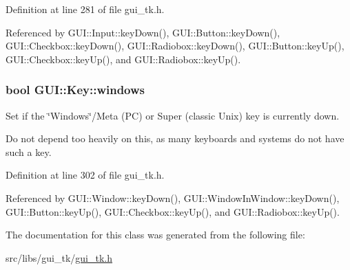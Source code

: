 Definition at line 281 of file gui\-\_\-tk.\-h.



Referenced by G\-U\-I\-::\-Input\-::key\-Down(), G\-U\-I\-::\-Button\-::key\-Down(), G\-U\-I\-::\-Checkbox\-::key\-Down(), G\-U\-I\-::\-Radiobox\-::key\-Down(), G\-U\-I\-::\-Button\-::key\-Up(), G\-U\-I\-::\-Checkbox\-::key\-Up(), and G\-U\-I\-::\-Radiobox\-::key\-Up().

\hypertarget{classGUI_1_1Key_abc017c8f165f2b4c857c757ef413da3c}{
\subsubsection[{windows}]{\setlength{\rightskip}{0pt plus 5cm}bool {\bf G\-U\-I\-::\-Key\-::windows}}}\label{classGUI_1_1Key_abc017c8f165f2b4c857c757ef413da3c}


Set if the \char`\"{}\-Windows\char`\"{}/\-Meta (P\-C) or Super (classic Unix) key is currently down. 

Do not depend too heavily on this, as many keyboards and systems do not have such a key. 

Definition at line 302 of file gui\-\_\-tk.\-h.



Referenced by G\-U\-I\-::\-Window\-::key\-Down(), G\-U\-I\-::\-Window\-In\-Window\-::key\-Down(), G\-U\-I\-::\-Button\-::key\-Up(), G\-U\-I\-::\-Checkbox\-::key\-Up(), and G\-U\-I\-::\-Radiobox\-::key\-Up().



The documentation for this class was generated from the following file\-:\begin{DoxyCompactItemize}
\item 
src/libs/gui\-\_\-tk/\hyperlink{gui__tk_8h}{gui\-\_\-tk.\-h}\end{DoxyCompactItemize}
